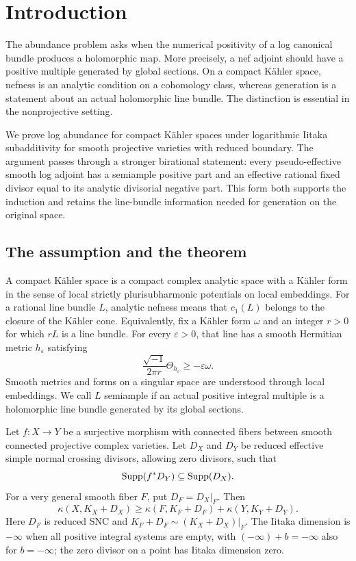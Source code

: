 \section{Introduction}\label{sec:introduction}

The abundance problem asks when the numerical positivity of a log canonical
bundle produces a holomorphic map. More precisely, a nef adjoint should have
a positive multiple generated by global sections. On a compact Kähler space,
nefness is an analytic condition on a cohomology class, whereas generation
is a statement about an actual holomorphic line bundle. The distinction is
essential in the nonprojective setting.

We prove log abundance for compact Kähler spaces under logarithmic Iitaka
subadditivity for smooth projective varieties with reduced boundary. The
argument passes through a stronger birational statement: every
pseudo-effective smooth log adjoint has a semiample positive part and an
effective rational fixed divisor equal to its analytic divisorial negative
part. This form both supports the induction and retains the line-bundle
information needed for generation on the original space.

\subsection{The assumption and the theorem}

A compact Kähler space is a compact complex analytic space with a Kähler
form in the sense of local strictly plurisubharmonic potentials on local
embeddings. For a rational line bundle \(L\), analytic nefness means that
\(c_1(L)\) belongs to the closure of the Kähler cone. Equivalently, fix a
Kähler form \(\omega\) and an integer \(r>0\) for which \(rL\) is a line
bundle. For every \(\varepsilon>0\), that line has a smooth Hermitian metric
\(h_\varepsilon\) satisfying
\[
 \frac{\sqrt{-1}}{2\pi r}\Theta_{h_\varepsilon}
 \geq-\varepsilon\omega.
\]
Smooth metrics and forms on a singular space are understood through local
embeddings. We call \(L\) semiample if an actual positive integral multiple
is a holomorphic line bundle generated by its global sections.

\begin{assumption}
\label{asm:log-iitaka}
Let \(f:X\to Y\) be a surjective morphism with connected fibers between
smooth connected projective complex varieties. Let \(D_X\) and \(D_Y\) be
reduced effective simple normal crossing divisors, allowing zero divisors,
such that
\[
 \operatorname{Supp}(f^*D_Y)\subseteq\operatorname{Supp}(D_X).
\]
For a very general smooth fiber \(F\), put \(D_F=D_X|_F\). Then
\[
 \kappa(X,K_X+D_X)\geq
 \kappa(F,K_F+D_F)+\kappa(Y,K_Y+D_Y).
\]
Here \(D_F\) is reduced SNC and
\(K_F+D_F\sim (K_X+D_X)|_F\). The Iitaka dimension is \(-\infty\) when
all positive integral systems are empty, with
\((-\infty)+b=-\infty\) also for \(b=-\infty\); the zero divisor on a
point has Iitaka dimension zero.
\end{assumption}

